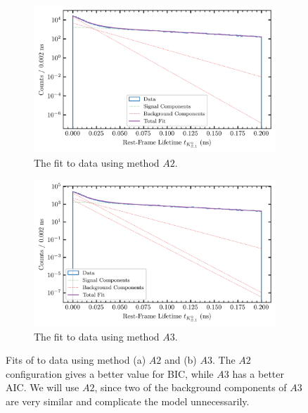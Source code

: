 \begin{figure}
  \begin{center}
    \begin{subfigure}[t]{\textwidth}
        \begin{center}
          \includegraphics[width=.8\columnwidth]{figures/splot_fit_data_chisqdof_3.4_splot_D_1s_2b.png}
        \caption{The fit to data using method $A2$.}
        \end{center}
        \end{subfigure}
        \begin{subfigure}[t]{\textwidth}
          \begin{center}
            \includegraphics[width=.8\columnwidth]{figures/splot_fit_data_chisqdof_3.4_splot_D_1s_3b.png}
        \caption{The fit to data using method $A3$.}
          \end{center}
        \end{subfigure}
        \caption{Fits of  to data using method (a) $A2$ and (b) $A3$. The $A2$ configuration gives a better value for BIC, while $A3$ has a better AIC. We will use $A2$, since two of the background components of $A3$ are very similar and complicate the model unnecessarily.}\label{fig:splot-A2-A3}
\end{center}
\end{figure}
